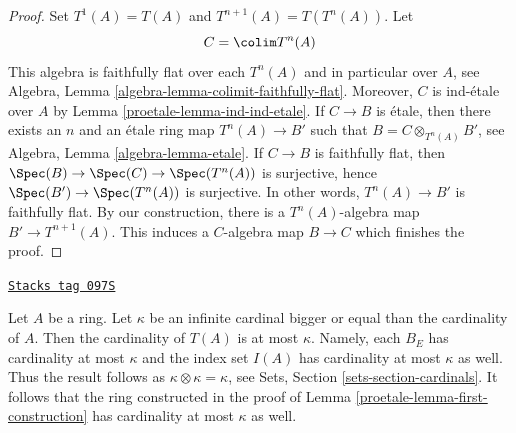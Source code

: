 \begin{proof}

Set $T^1(A) = T(A)$ and $T^{n + 1}(A) = T(T^n(A))$. Let
$$
C = \colim T^n(A)
$$
This algebra is faithfully flat over each $T^n(A)$ and in particular
over $A$, see
Algebra, Lemma \ref{algebra-lemma-colimit-faithfully-flat}.
Moreover, $C$ is ind-\'etale over $A$ by Lemma \ref{proetale-lemma-ind-ind-etale}.
If $C \to B$ is \'etale, then there exists an $n$ and an \'etale
ring map $T^n(A) \to B'$ such that $B = C \otimes_{T^n(A)} B'$, see
Algebra, Lemma \ref{algebra-lemma-etale}.
If $C \to B$ is faithfully flat, then $\Spec(B) \to \Spec(C) \to \Spec(T^n(A))$
is surjective, hence $\Spec(B') \to \Spec(T^n(A))$ is surjective.
In other words, $T^n(A) \to B'$ is faithfully flat.
By our construction, there is a $T^n(A)$-algebra map
$B' \to T^{n + 1}(A)$. This induces a $C$-algebra map $B \to C$
which finishes the proof.
\end{proof}

\begin{remark}[Size T]
\label{proetale-remark-size-T}
\href{https://stacks.math.columbia.edu/tag/097S}{\texttt{Stacks tag 097S}}

Let $A$ be a ring. Let $\kappa$ be an infinite cardinal bigger or
equal than the cardinality of $A$. Then the cardinality of $T(A)$
is at most $\kappa$. Namely, each $B_E$ has cardinality at most
$\kappa$ and the index set $I(A)$ has cardinality at most $\kappa$
as well. Thus the result follows as $\kappa \otimes \kappa = \kappa$, see
Sets, Section \ref{sets-section-cardinals}. It follows that the
ring constructed in the proof of Lemma \ref{proetale-lemma-first-construction}
has cardinality at most $\kappa$ as well.
\end{remark}

